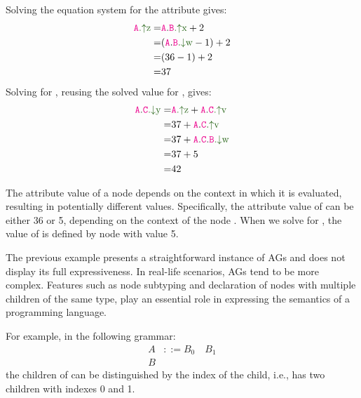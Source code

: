 Solving the equation system for the attribute  gives:
\begin{align*}
  \Asyn{A}{z} =& \astnode{A}.\Asyn{B}{x} + 2 \\
  =& (\astnode{A}.\Ainh{B}{w} - 1) + 2 \\
  =& (36 - 1) + 2 \\
  =& 37
\end{align*}
Solving for  , reusing the solved value for , gives:
\begin{align*}
  \astnode{A}.\Ainh{C}{y} = & \Asyn{A}{z} + \astnode{A}.\Asyn{C}{v}\\
  = & 37 + \astnode{A}.\Asyn{C}{v} \\
  = & 37 + \astnode{A}.\astnode{C}.\Ainh{B}{w} \\
  = & 37 + 5 \\
  = & 42
\end{align*}

The attribute value of a node  depends on the context in which it is
evaluated, resulting in potentially different values. Specifically, the attribute
value of   can be either 36 or 5, depending on the context of the node .
When we solve for , the value of 
is defined by node  with value 5.



The previous example presents a straightforward instance of AGs
and does not display its full expressiveness. In real-life scenarios, AGs
tend to be more complex. Features such as node subtyping and declaration of nodes with multiple
children of the same type, play an essential role in expressing the semantics of
a programming language.

For example, in the following grammar:
    \begin{align*}
        A& ::= B_0 \quad B_1 \\
        B&
    \end{align*}
the children of  can be distinguished by the index of the child, i.e.,  has two children
 with indexes 0 and 1.


